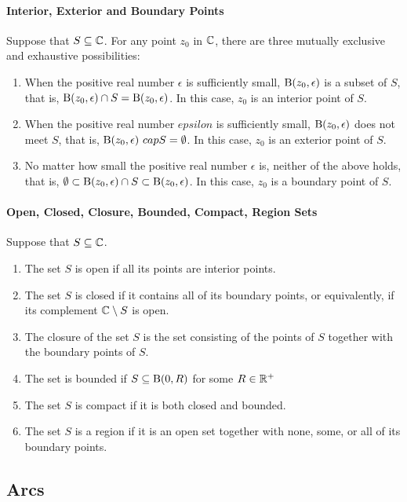 \paragraph{Interior, Exterior and Boundary Points}
Suppose that \(S \subseteq \mathbb{C}\). For any point \(z_0\) in \(\mathbb{C}\), there are three mutually exclusive and exhaustive possibilities:
\begin{enumerate}[label=(\arabic*)]
    \item When the positive real number \(\epsilon\) is sufficiently small, \(\mathrm{B}(z_0, \epsilon)\) is a subset of \(S\), that is, \(\mathrm{B}(z_0, \epsilon) \cap S = \mathrm{B}(z_0, \epsilon)\). In this case, \(z_0\) is an interior point of \(S\).
    \item When the positive real number \(epsilon\) is sufficiently small, \(\mathrm{B}(z_0, \epsilon)\) does not meet \(S\), that is, \(\mathrm{B}(z_0, \epsilon)\ cap S = \emptyset\). In this case, \(z_0\) is an exterior point of \(S\).
    \item No matter how small the positive real number \(\epsilon\) is, neither of the above holds, that is, \(\emptyset \subset \mathrm{B}(z_0, \epsilon) \cap S \subset \mathrm{B}(z_0, \epsilon)\). In this case, \(z_0\) is a boundary point of \(S\).
\end{enumerate}

\paragraph{Open, Closed, Closure, Bounded, Compact, Region Sets}
Suppose that \(S \subseteq \mathbb{C}\).
\begin{enumerate}[label=(\arabic*)]
    \item The set \(S\) is open if all its points are interior points.
    \item The set \(S\) is closed if it contains all of its boundary points, or equivalently, if its complement \(\mathbb{C} \setminus S\) is open.
    \item The closure of the set \(S\) is the set consisting of the points of \(S\) together with the boundary points of \(S\).
    \item The set is bounded if \(S \subseteq \mathrm{B}(0, R)\) for some \(R \in \mathbb{R}^+\)
    \item The set \(S\) is compact if it is both closed and bounded.
    \item The set \(S\) is a region if it is an open set together with none, some, or all of its boundary points.
\end{enumerate}

\subsection{Arcs}
